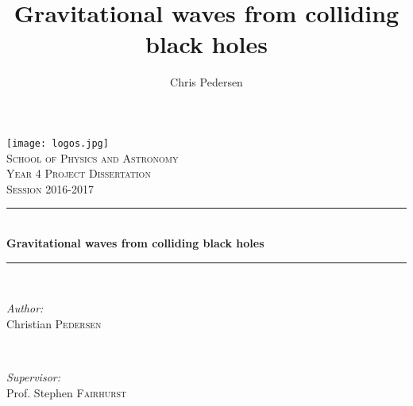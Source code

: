 \documentclass[11pt]{article}
\title{Gravitational waves from colliding black holes}
\author{Chris Pedersen}
\begin{document}
\begin{titlepage}
	
	\newcommand{\HRule}{\rule{\linewidth}{0.5mm}} %
	
	\center %
	
	\texttt{[image: logos.jpg]}\\[1cm]
	\textsc{\LARGE School of Physics and Astronomy}\\[1.5cm] %
	\textsc{\Large Year 4 Project Dissertation}\\[0.5cm] %
	\textsc{\large Session 2016-2017}\\[0.5cm] %
	
	
	\HRule \\[0.2cm]
	{ \huge \bfseries Gravitational waves from colliding black holes}\\[0.4cm] %
	\HRule \\[1.cm]
	
	
\begin{minipage}{0.4\textwidth}
	\begin{flushleft} \large
		\emph{Author:}\\
		Christian \textsc{Pedersen} %
	\end{flushleft}
\end{minipage}
~
\begin{minipage}{0.4\textwidth}
	\begin{flushright} \large
		\emph{Supervisor:} \\
		Prof. Stephen \textsc{Fairhurst} %
	\end{flushright}
\end{minipage}\\[1cm]


\end{titlepage}
\end{document}
